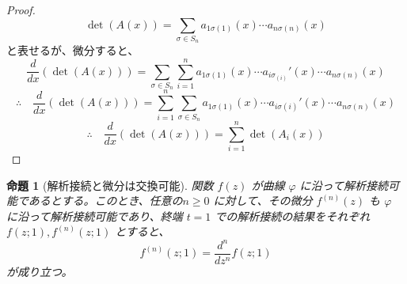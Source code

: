 \documentclass[paper=a4, fontsize=11pt]{jlreq} %
\theoremstyle{break}
\newtheorem{proposition}[theorem]{命題}
\theoremstyle{qa}
\theoremstyle{remark} %
\begin{document}
\begin{proof}
    \[
    \det(A(x))=\sum_{\sigma\in S_{n}}a_{1\sigma(1)}(x)\cdots a_{n\sigma(n)}(x)
    \]
    と表せるが、微分すると、
    \[
    \frac{d}{dx}(\det(A(x)))=\sum_{\sigma\in S_{n}}\sum_{i=1}^{n}a_{1\sigma(1)}(x)\cdots a_{i\sigma_(i)}'(x)\cdots a_{n\sigma(n)}(x)
    \]
    \[
    \therefore\quad
    \frac{d}{dx}(\det(A(x)))=\sum_{i=1}^{n}\sum_{\sigma\in S_{n}}a_{1\sigma(1)}(x)\cdots a_{i\sigma(i)}'(x)\cdots a_{n\sigma(n)}(x)
    \]
    \[
    \therefore\quad
    \frac{d}{dx}(\det(A(x)))=\sum_{i=1}^{n}\det(A_{i}(x))
    \]
    
\end{proof}
\begin{proposition}[解析接続と微分は交換可能]\label{prop:interchange-ac-diff}
    関数 $f(z)$ が曲線 $\varphi$ に沿って解析接続可能であるとする。このとき、任意の$n\geq 0$ に対して、その微分 $f^{(n)}(z)$ も $\varphi$ に沿って解析接続可能であり、終端 $t=1$ での解析接続の結果をそれぞれ $f(z;1), f^{(n)}(z;1)$ とすると、
    \[
    f^{(n)}(z;1) = \frac{d^{n}}{dz^{n}}f(z;1)
    \]
    が成り立つ。
\end{proposition}
\end{document}
